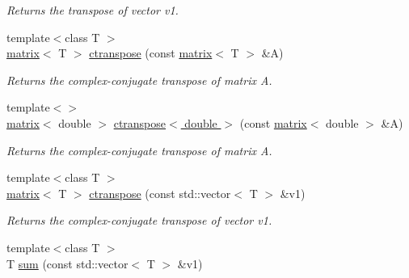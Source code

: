 \begin{DoxyCompactItemize}
\begin{DoxyCompactList}\small\item\em Returns the transpose of vector v1. \end{DoxyCompactList}\item 
\hypertarget{namespacekeycpp_a14503c0419f365433d88fa081d473210}{{\footnotesize template$<$class T $>$ }\\\hyperlink{classkeycpp_1_1matrix}{matrix}$<$ T $>$ \hyperlink{namespacekeycpp_a14503c0419f365433d88fa081d473210}{ctranspose} (const \hyperlink{classkeycpp_1_1matrix}{matrix}$<$ T $>$ \&A)}\label{namespacekeycpp_a14503c0419f365433d88fa081d473210}

\begin{DoxyCompactList}\small\item\em Returns the complex-\/conjugate transpose of matrix A. \end{DoxyCompactList}\item 
\hypertarget{namespacekeycpp_a9fc1e2c9bf6ee79ee28a6f25b7b55b23}{{\footnotesize template$<$$>$ }\\\hyperlink{classkeycpp_1_1matrix}{matrix}$<$ double $>$ \hyperlink{namespacekeycpp_a9fc1e2c9bf6ee79ee28a6f25b7b55b23}{ctranspose$<$ double $>$} (const \hyperlink{classkeycpp_1_1matrix}{matrix}$<$ double $>$ \&A)}\label{namespacekeycpp_a9fc1e2c9bf6ee79ee28a6f25b7b55b23}

\begin{DoxyCompactList}\small\item\em Returns the complex-\/conjugate transpose of matrix A. \end{DoxyCompactList}\item 
\hypertarget{namespacekeycpp_ad276b8edd0f4f62b430620047245d18d}{{\footnotesize template$<$class T $>$ }\\\hyperlink{classkeycpp_1_1matrix}{matrix}$<$ T $>$ \hyperlink{namespacekeycpp_ad276b8edd0f4f62b430620047245d18d}{ctranspose} (const std\-::vector$<$ T $>$ \&v1)}\label{namespacekeycpp_ad276b8edd0f4f62b430620047245d18d}

\begin{DoxyCompactList}\small\item\em Returns the complex-\/conjugate transpose of vector v1. \end{DoxyCompactList}\item 
\hypertarget{namespacekeycpp_a053c56f068ffe8c4a32e5a820b424b6e}{{\footnotesize template$<$class T $>$ }\\T \hyperlink{namespacekeycpp_a053c56f068ffe8c4a32e5a820b424b6e}{sum} (const std\-::vector$<$ T $>$ \&v1)}\label{namespacekeycpp_a053c56f068ffe8c4a32e5a820b424b6e}


\end{DoxyCompactItemize}
